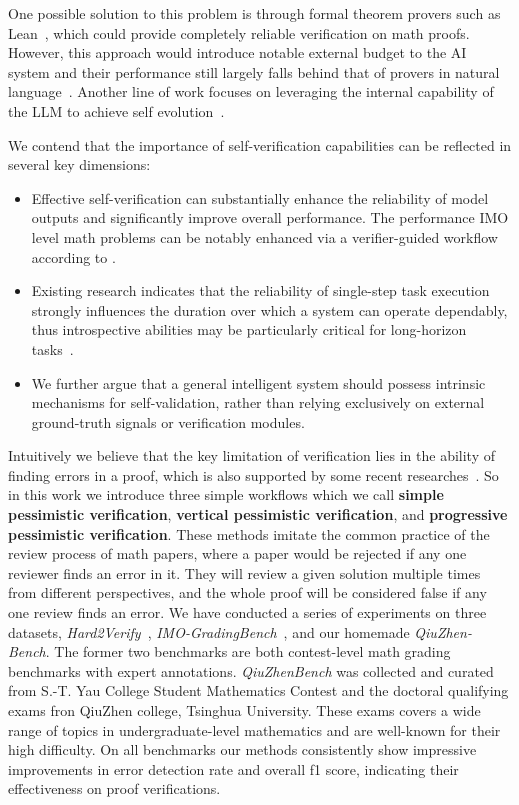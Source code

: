 \documentclass{article} %
\begin{document}
One possible solution to this problem is through formal theorem provers such as Lean~\citep{chen_seed-prover_2025, varambally_hilbert_2025}, which could provide completely reliable verification on math proofs. However, this approach would introduce notable external budget to the AI system and their performance still largely falls behind that of provers in natural language~\citep{dekoninck_open_2025}. Another line of work focuses on leveraging the internal capability of the LLM to achieve self evolution~\citep{zuo_ttrl_2025, yu_rlpr_2025, xu_direct_2025}.

We contend that the importance of self-verification capabilities can be reflected in several key dimensions:

\begin{itemize}
  \item Effective self-verification can substantially enhance the reliability of model outputs and significantly improve overall performance. The performance IMO level math problems can be notably enhanced via a verifier-guided workflow according to \citet{huang_gemini_2025, luong_towards_2025}.
  \item Existing research indicates that the reliability of single-step task execution strongly influences the duration over which a system can operate dependably, thus introspective abilities may be particularly critical for long-horizon tasks~\citep{kwa_measuring_2025}.
  \item We further argue that a general intelligent system should possess intrinsic mechanisms for self-validation, rather than relying exclusively on external ground-truth signals or verification modules.
\end{itemize}

Intuitively we believe that the key limitation of verification lies in the ability of finding errors in a proof, which is also supported by some recent researches~\citep{pandit_hard2verify_2025}. So in this work we introduce three simple workflows which we call \textbf{simple pessimistic verification}, \textbf{vertical pessimistic verification}, and \textbf{progressive pessimistic verification}. These methods imitate the common practice of the review process of math papers, where a paper would be rejected if any one reviewer finds an error in it. They will review a given solution multiple times from different perspectives, and the whole proof will be considered false if any one review finds an error. We have conducted a series of experiments on three datasets, \textit{Hard2Verify}~\citep{pandit_hard2verify_2025}, \textit{IMO-GradingBench}~\citep{luong_towards_2025}, and our homemade \textit{QiuZhen-Bench}. The former two benchmarks are both contest-level math grading benchmarks with expert annotations. \textit{QiuZhenBench} was collected and curated from S.-T. Yau College Student Mathematics Contest and the doctoral qualifying exams fron QiuZhen college, Tsinghua University. These exams covers a wide range of topics in undergraduate-level mathematics and are well-known for their high difficulty. On all benchmarks our methods consistently show impressive improvements in error detection rate and overall f1 score, indicating their effectiveness on proof verifications.
\end{document}
